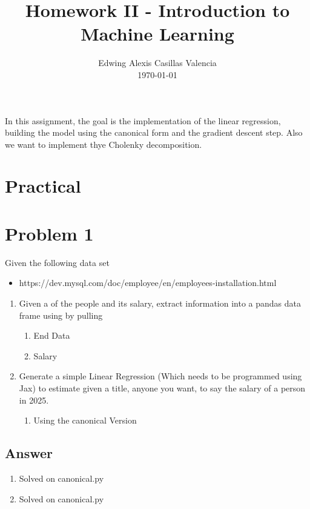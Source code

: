 \documentclass[conference, onecolumn]{IEEEtran}
\author{Edwing Alexis Casillas Valencia\\
	\today}
\title{Homework II - Introduction to Machine Learning}
\begin{document}
	\maketitle
	\thispagestyle{empty}
	\begin{abstract}
		
	\end{abstract}
	In this assignment, the goal is the implementation of the linear regression, building the model using the canonical form and the gradient descent step. Also we want to implement thye Cholenky decomposition.
	\section*{\textbf{Practical}}
	\section*{Problem 1}
	Given the following data set
	\begin{itemize}
		\item https://dev.mysql.com/doc/employee/en/employees-installation.html
	\end{itemize}
	\begin{enumerate}
		\item [(a)] Given a of the people and its salary, extract information into a pandas data frame using by pulling
		\begin{enumerate}
			\item[i.] End Data
			\item[ii.] Salary
		\end{enumerate}
		\item [(b)] Generate a simple Linear Regression (Which needs to be programmed using Jax) to estimate given a title, anyone you want, to say the salary of a person in 2025.
		\begin{enumerate}
			\item[i.] Using the canonical Version
		\end{enumerate}
	\end{enumerate}
	
	\subsection*{Answer}
	\begin{enumerate}
		\item[(a)] Solved on canonical.py
		\item[(b)] Solved on canonical.py
	\end{enumerate}
	
\end{document}
